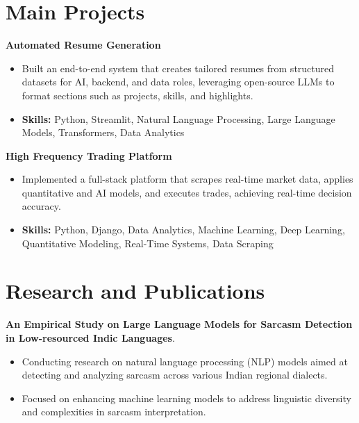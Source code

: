 \documentclass[a4paper,11pt]{article}
\begin{document}
\section{\textbf{Main Projects}}

\vspace{1mm}
  \textbf{Automated Resume Generation  }
\vspace{-1.5mm} %
\begin{itemize}
  \item Built an end-to-end system that creates tailored resumes from structured datasets for AI, backend, and data roles, leveraging open-source LLMs to format sections such as projects, skills, and highlights.
\vspace{-3mm}
  \item \textbf{Skills:} Python, Streamlit, Natural Language Processing, Large Language Models, Transformers, Data Analytics
\end{itemize}


\vspace{1mm}
   \textbf{High Frequency Trading Platform }
\vspace{-1.5mm} %
\begin{itemize}
  \item Implemented a full-stack platform that scrapes real-time market data, applies quantitative and AI models, and executes trades, achieving real-time decision accuracy.
\vspace{-3mm}
  \item \textbf{Skills:} Python, Django, Data Analytics, Machine Learning, Deep Learning, Quantitative Modeling, Real-Time Systems, Data Scraping
\end{itemize}



\section{\textbf{Research and Publications} \hfill }
\vspace{1mm}
  \textbf{An Empirical Study on Large Language Models for Sarcasm Detection in Low-resourced Indic Languages}.
\vspace{-1mm} %
\begin{itemize}
  \item Conducting research on natural language processing (NLP) models aimed at detecting and analyzing sarcasm across various Indian regional dialects.
\vspace{-3mm}
  \item Focused on enhancing machine learning models to address linguistic diversity and complexities in sarcasm interpretation.
\end{itemize}
\end{document}
